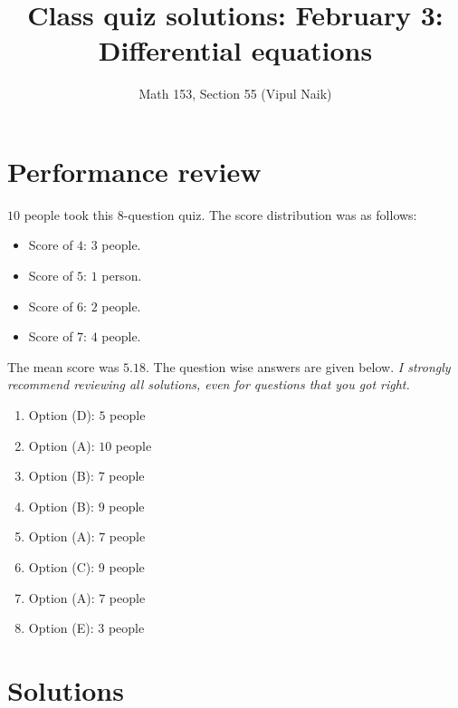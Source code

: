 \documentclass[10pt]{amsart}
\title{Class quiz solutions: February 3: Differential equations}
\author{Math 153, Section 55 (Vipul Naik)}
\begin{document}
\maketitle

\section{Performance review}

$10$ people took this $8$-question quiz. The score distribution was as
follows:

\begin{itemize}
\item Score of $4$: $3$ people.
\item Score of $5$: $1$ person.
\item Score of $6$: $2$ people.
\item Score of $7$: $4$ people.
\end{itemize}

The mean score was $5.18$. The question wise answers are given
below. {\em I strongly recommend reviewing all solutions, even for
questions that you got right.}

\begin{enumerate}
\item Option (D): $5$ people
\item Option (A): $10$ people
\item Option (B): $7$ people
\item Option (B): $9$ people
\item Option (A): $7$ people
\item Option (C): $9$ people
\item Option (A): $7$ people
\item Option (E): $3$ people
\end{enumerate}
\section{Solutions}
\end{document}
